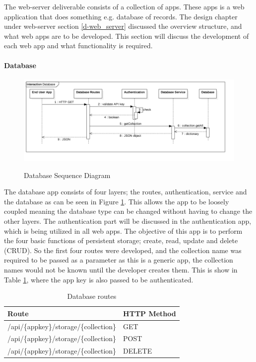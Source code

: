 

The web-server deliverable consists of a collection of apps. These apps is a web application that does something e.g. database of records. The design chapter under web-server section \ref{d-web_server} discussed the overview structure, and what web apps are to be developed. This section will discuss the development of each web app and what functionality is required.

\paragraph{Database}

\begin{figure}[!h]
    \caption{Database Sequence Diagram}
    \centering
    \includegraphics[width=150mm]{images/sequence/Database}
    \label{fig:database-seq}
\end{figure} 

The database app consists of four layers; the routes, authentication, service and the database as can be seen in Figure \ref{fig:database-seq}. This allows the app to be loosely coupled meaning the database type can be changed without having to change the other layers. The authentication part will be discussed in the authentication app, which is being utilized in all web apps. The objective of this app is to perform the four basic functions of persistent storage; create, read, update and delete (CRUD). So the first four routes were developed, and the collection name was required to be passed as a parameter as this is a generic app, the collection names would not be known until the developer creates them. This is show in Table \ref{tb:db-routes}, where the app key is also passed to be authenticated. 

\begin{table}[!h]
\centering
\caption{Database routes}
\label{tb:db-routes}
\begin{tabular}{|l|l|}
\hline
\rowcolor{green!20}
Route                                  & HTTP Method \\ \hline
/api/\{appkey\}/storage/\{collection\} & GET         \\ \hline
/api/\{appkey\}/storage/\{collection\} & POST        \\ \hline
/api/\{appkey\}/storage/\{collection\} & DELETE      \\ \hline
\end{tabular}
\end{table}

